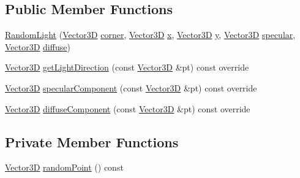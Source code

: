 \subsection*{Public Member Functions}
\begin{DoxyCompactItemize}
\item 
\hyperlink{classRandomLight_aaa458e28a15e5ac83b393dc689def3a3}{Random\+Light} (\hyperlink{classVector3D}{Vector3D} \hyperlink{classRandomLight_ac54b3aa2ddb79d7f7363f64ed0f96989}{corner}, \hyperlink{classVector3D}{Vector3D} \hyperlink{classRandomLight_a5582baaa81ff0117f66ef8f3636859ed}{x}, \hyperlink{classVector3D}{Vector3D} \hyperlink{classRandomLight_a9d9e2fcde9c0d83b655f9a259d54a6d8}{y}, \hyperlink{classVector3D}{Vector3D} \hyperlink{classRandomLight_ac8014c223873c92490dfb697cc4663d4}{specular}, \hyperlink{classVector3D}{Vector3D} \hyperlink{classRandomLight_a26ffb2886dbb56b24d77fd8c760c8b28}{diffuse})
\item 
\hyperlink{classVector3D}{Vector3D} \hyperlink{classRandomLight_a70c038d63e66f520a296dccddcf9035f}{get\+Light\+Direction} (const \hyperlink{classVector3D}{Vector3D} \&pt) const override
\item 
\hyperlink{classVector3D}{Vector3D} \hyperlink{classRandomLight_af9922ba2ce0c9dc16026db945d8f1506}{specular\+Component} (const \hyperlink{classVector3D}{Vector3D} \&pt) const override
\item 
\hyperlink{classVector3D}{Vector3D} \hyperlink{classRandomLight_a371cbc5df30db46ac53cd0a9be91ac52}{diffuse\+Component} (const \hyperlink{classVector3D}{Vector3D} \&pt) const override
\end{DoxyCompactItemize}
\subsection*{Private Member Functions}
\begin{DoxyCompactItemize}
\item 
\hyperlink{classVector3D}{Vector3D} \hyperlink{classRandomLight_a44143563da1eab27ea905fc58b82df46}{random\+Point} () const 
\end{DoxyCompactItemize}
